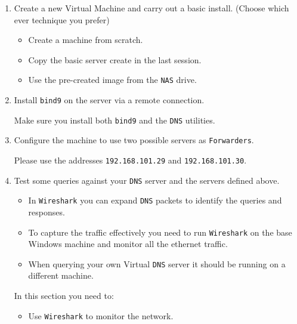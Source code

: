\documentclass[11pt]{article}
\begin{document}
\begin{enumerate}
    \item Create a new Virtual Machine and carry out a basic install. (Choose which ever technique you prefer)
        \begin{itemize}
            \item Create a machine from scratch.
            \item Copy the basic server create in the last session.
            \item Use the pre-created image from the \texttt{NAS} drive.
        \end{itemize}
    \item Install \texttt{bind9} on the server via a remote connection. 
        \begin{tcolorbox}[title={\textbf{NOTE:}}]
            Make sure you install both \texttt{bind9} and the \texttt{DNS} utilities. 
        \end{tcolorbox}
    \item Configure the machine to use two possible servers as \texttt{Forwarders}.
        \begin{tcolorbox}[title={\textbf{NOTE:}}]
            Please use the addresses \texttt{192.168.101.29} and \texttt{192.168.101.30}.
        \end{tcolorbox}
    \item Test some queries against your \texttt{DNS} server and the servers defined above.
        \begin{tcolorbox}[title={\textbf{NOTE:}}]
            \begin{itemize}
                \item In \texttt{Wireshark} you can expand \texttt{DNS} packets to identify the queries and responses.
                \item To capture the traffic effectively you need to run \texttt{Wireshark} on the base Windows machine and monitor all the ethernet traffic.
                \item When querying your own Virtual \texttt{DNS} server it should be running on a different machine.
            \end{itemize}
        \end{tcolorbox}
        \begin{tcolorbox}[colback=blue!20]
            In this section you need to:
            \begin{itemize}
                \item Use \texttt{Wireshark} to monitor the network.

\end{itemize}
\end{tcolorbox}
\end{enumerate}
\end{document}
